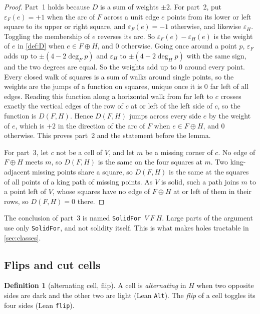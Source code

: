 \documentclass[11pt]{article}
\theoremstyle{plain}
\theoremstyle{definition}
\newtheorem{definition}[theorem]{Definition}
\theoremstyle{remark}
\newcommand{\lean}[1]{\texttt{#1}}
\begin{document}
\begin{proof}
Part~1 holds because $D$ is a sum of weights $\pm2$.
For part~2, put $\varepsilon_F(e)=+1$ when the arc of $F$ across a unit edge $e$ points from its
lower or left square to its upper or right square, and $\varepsilon_F(e)=-1$ otherwise, and
likewise $\varepsilon_H$.
Toggling the membership of $e$ reverses its arc.
So $\varepsilon_F(e)-\varepsilon_H(e)$ is the weight of $e$ in \cref{def:D} when $e\in F\oplus H$,
and $0$ otherwise.
Going once around a point $p$, $\varepsilon_F$ adds up to $\pm(4-2\deg_F p)$ and $\varepsilon_H$ to
$\pm(4-2\deg_H p)$ with the same sign, and the two degrees are equal.
So the weights add up to $0$ around every point.
Every closed walk of squares is a sum of walks around single points, so the weights are the jumps
of a function on squares, unique once it is $0$ far left of all edges.
Reading this function along a horizontal walk from far left to $c$ crosses exactly the vertical
edges of the row of $c$ at or left of the left side of $c$, so the function is $D(F,H)$.
Hence $D(F,H)$ jumps across every side $e$ by the weight of $e$, which is $+2$ in the direction of
the arc of $F$ when $e\in F\oplus H$, and $0$ otherwise.
This proves part~2 and the statement before the lemma.

For part~3, let $c$ not be a cell of $V$, and let $m$ be a missing corner of $c$.
No edge of $F\oplus H$ meets $m$, so $D(F,H)$ is the same on the four squares at $m$.
Two king-adjacent missing points share a square, so $D(F,H)$ is the same at the squares of all
points of a king path of missing points.
As $V$ is solid, such a path joins $m$ to a point left of $V$, whose squares have no edge of
$F\oplus H$ at or left of them in their rows, so $D(F,H)=0$ there.
\end{proof}

The conclusion of part~3 is named \lean{SolidFor}~$V\ F\ H$.
Large parts of the argument use only \lean{SolidFor}, and not solidity itself.
This is what makes holes tractable in \cref{sec:classes}.

\subsection{Flips and cut cells}

\begin{definition}[alternating cell, flip]
A cell is \emph{alternating} in $H$ when two opposite sides are dark and the other two are light
(Lean \lean{Alt}).
The \emph{flip} of a cell toggles its four sides (Lean \lean{flip}).
\end{definition}
\end{document}
